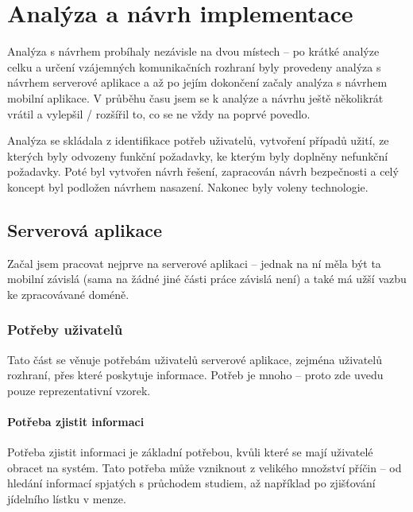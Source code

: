 
\chapter{Analýza a návrh implementace}


Analýza s návrhem probíhaly nezávisle na dvou místech -- po krátké analýze celku a určení vzájemných komunikačních rozhraní byly provedeny analýza s návrhem serverové aplikace a až po jejím dokončení začaly analýza s návrhem mobilní aplikace. V průběhu času jsem se k analýze a návrhu ještě několikrát vrátil a vylepšil / rozšířil to, co se ne vždy na poprvé povedlo.

Analýza se skládala z identifikace potřeb uživatelů, vytvoření případů užití, ze kterých byly odvozeny funkční požadavky, ke kterým byly doplněny nefunkční požadavky. Poté byl vytvořen návrh řešení, zapracován návrh bezpečnosti a celý koncept byl podložen návrhem nasazení. Nakonec byly voleny technologie.

\section{Serverová aplikace}
Začal jsem pracovat nejprve na serverové aplikaci -- jednak na ní měla být ta mobilní závislá (sama na žádné jiné části práce závislá není) a také má užší vazbu ke zpracovávané doméně.


\subsection{Potřeby uživatelů}
Tato část se věnuje potřebám uživatelů serverové aplikace, zejména uživatelů rozhraní, přes které poskytuje informace. Potřeb je mnoho -- proto zde uvedu pouze reprezentativní vzorek.

\subsubsection{Potřeba zjistit informaci}
Potřeba zjistit informaci je základní potřebou, kvůli které se mají uživatelé obracet na systém. Tato potřeba může vzniknout z velikého množství příčin -- od hledání informací spjatých s průchodem studiem, až například po zjišťování jídelního lístku v menze.

